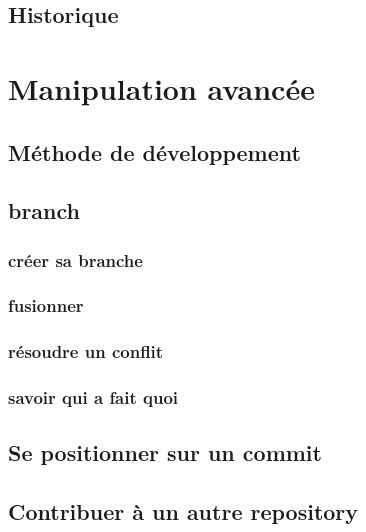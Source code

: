 \documentclass[a4paper,10pt]{article}
\begin{document}
  \subsection{Historique}
\section{Manipulation avancée}
  \subsection{Méthode de développement}
  \subsection{branch}
     \subsubsection{créer sa branche}
     \subsubsection{fusionner}
     \subsubsection{résoudre un conflit}
     \subsubsection{savoir qui a fait quoi}
  \subsection{Se positionner sur un commit}
  \subsection{Contribuer à un autre repository}
\end{document}
